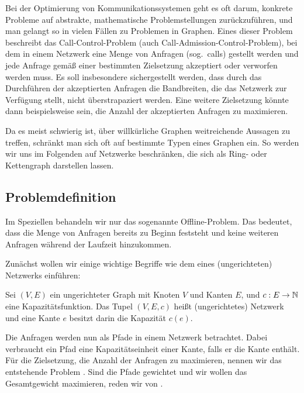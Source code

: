 Bei der Optimierung von Kommunikationssystemen geht es oft darum, konkrete Probleme auf abstrakte, mathematische 
Problemstellungen zurückzuführen, und man gelangt so in vielen Fällen zu Problemen in Graphen.
Eines dieser Problem beschreibt das Call-Control-Problem (auch Call-Admission-Control-Problem), bei dem
in einem Netzwerk eine Menge von Anfragen (sog.\ calls) gestellt werden und jede Anfrage gemäß einer bestimmten Zielsetzung
akzeptiert oder verworfen werden muss.
Es soll insbesondere sichergestellt werden, dass durch das Durchführen der akzeptierten Anfragen die Bandbreiten,
die das Netzwerk zur Verfügung stellt, nicht überstrapaziert werden.
Eine weitere Zielsetzung könnte dann beispielsweise sein, die Anzahl der akzeptierten Anfragen zu maximieren.

Da es meist schwierig ist, über willkürliche Graphen weitreichende Aussagen zu treffen, schränkt
man sich oft auf bestimmte Typen eines Graphen ein.
So werden wir uns im Folgenden auf Netzwerke beschränken, die sich als Ring- oder Kettengraph darstellen lassen.

\subsection{Problemdefinition}
Im Speziellen behandeln wir nur das sogenannte Offline-Problem.
Das bedeutet, dass die Menge von Anfragen bereits zu Beginn feststeht und keine weiteren Anfragen während der
Laufzeit hinzukommen.

Zunächst wollen wir einige wichtige Begriffe wie dem eines (ungerichteten) Netzwerks einführen:

\begin{definition}[Netzwerk]
	Sei $(V,E)$ ein ungerichteter Graph mit Knoten $V$ und Kanten $E$, und $c: E \to \mathbb N$ eine Kapazitätsfunktion.
	Das Tupel $(V,E,c)$ heißt (ungerichtetes) Netzwerk und eine Kante $e$ besitzt darin die Kapazität $c(e)$.
\end{definition}

Die Anfragen werden nun als Pfade in einem Netzwerk betrachtet.
Dabei verbraucht ein Pfad eine Kapazitätseinheit einer Kante, falls er die Kante enthält.
Für die Zielsetzung, die Anzahl der Anfragen zu maximieren, nennen wir das entstehende Problem \CallControl.
Sind die Pfade gewichtet und wir wollen das Gesamtgewicht maximieren, reden wir von \WeightedCallControl.

